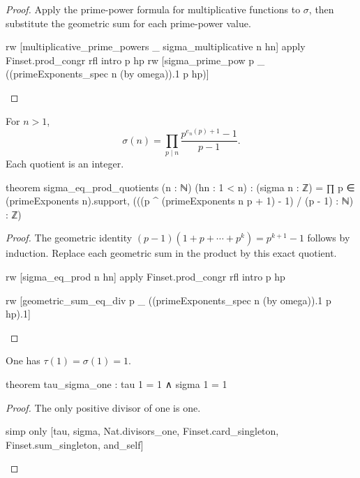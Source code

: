 \begin{proof}
  Apply the prime-power formula for multiplicative functions to $\sigma$, then substitute the
  geometric sum for each prime-power value.

  \begin{lean}
    rw [multiplicative_prime_powers _ sigma_multiplicative n hn]
    apply Finset.prod_congr rfl
    intro p hp
    rw [sigma_prime_pow p _ ((primeExponents_spec n (by omega)).1 p hp)]
  \end{lean}
\end{proof}

\begin{theorem}
  \label{ent:thm:sigma-eq-prod-quotients}
  For $n>1$, \[ \sigma(n)=\prod_{p\mid n}\frac{p^{e_n(p)+1}-1}{p-1}. \] Each quotient is an integer.

  \begin{lean}
    theorem sigma_eq_prod_quotients (n : ℕ) (hn : 1 < n) :
        (sigma n : ℤ) = ∏ p ∈ (primeExponents n).support,
          (((p ^ (primeExponents n p + 1) - 1) / (p - 1) : ℕ) : ℤ)
  \end{lean}
\end{theorem}

\begin{proof}
  The geometric identity $(p-1)(1+p+\cdots+p^k)=p^{k+1}-1$ follows by induction.
  Replace each geometric sum in the product by this exact quotient.

  \begin{lean}
    rw [sigma_eq_prod n hn]
    apply Finset.prod_congr rfl
    intro p hp

    rw [geometric_sum_eq_div p _ ((primeExponents_spec n (by omega)).1 p hp).1]
  \end{lean}
\end{proof}

\begin{theorem}
  \label{ent:thm:tau-sigma-one}
  One has $\tau(1)=\sigma(1)=1$.

  \begin{lean}
    theorem tau_sigma_one : tau 1 = 1 ∧ sigma 1 = 1
  \end{lean}
\end{theorem}

\begin{proof}
  The only positive divisor of one is one.

  \begin{lean}
    simp only [tau, sigma, Nat.divisors_one, Finset.card_singleton, Finset.sum_singleton, and_self]
  \end{lean}
\end{proof}


